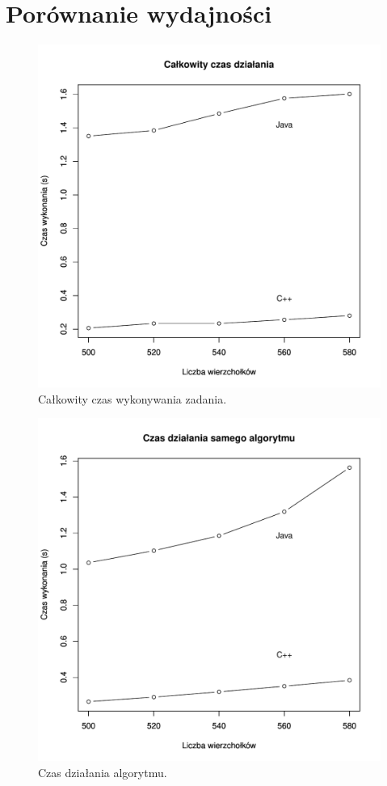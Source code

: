 \section{Porównanie wydajności}

\begin{figure}
\centering
\includegraphics[scale=0.7]{plots/allTimeCompare.pdf}
\caption{Całkowity czas wykonywania zadania.}
\label{p:AllTimeCompare}
\end{figure}

\begin{figure}
\centering
\includegraphics[scale=0.7]{plots/algTimeCompare2.pdf}
\caption{Czas działania algorytmu.}
\label{p:AlgTimeCompare}
\end{figure}

